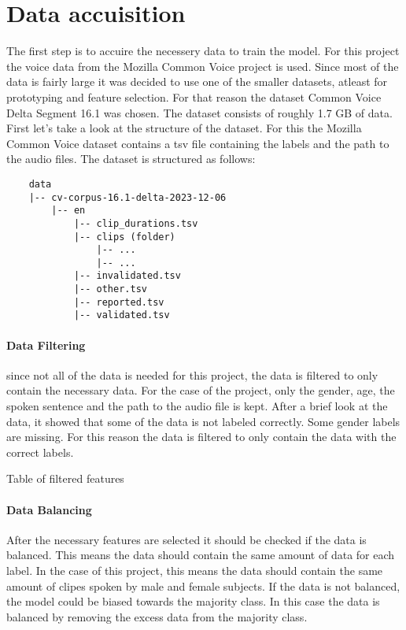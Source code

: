 \section{Data accuisition}

    The first step is to accuire the necessery data to train the model. For this project the voice data from the Mozilla Common Voice project is used. Since most of the data is fairly large it was decided to use one of the smaller datasets, atleast for prototyping and feature selection. For that reason the dataset Common Voice Delta Segment 16.1 was chosen. The dataset consists of roughly 1.7 GB of data. First let's take a look at the structure of the dataset. For this the Mozilla Common Voice dataset contains a tsv file containing the labels and the path to the audio files. 
    \break
    The dataset is structured as follows:
    
    {\iosevka
    \begin{verbatim}
    data
    |-- cv-corpus-16.1-delta-2023-12-06
        |-- en
            |-- clip_durations.tsv
            |-- clips (folder)
                |-- ...
                |-- ...
            |-- invalidated.tsv
            |-- other.tsv
            |-- reported.tsv
            |-- validated.tsv
    \end{verbatim}
    }

    \paragraph{Data Filtering}
    since not all of the data is needed for this project, the data is filtered to only contain the necessary data. For the case of the project, only the gender, age, the spoken sentence and the path to the audio file is kept. After a brief look at the data, it showed that some of the data is not labeled correctly. Some gender labels are missing. For this reason the data is filtered to only contain the data with the correct labels.

    \begin{table}[h!]
        \begin{adjustbox}{max width=\textwidth}
        \end{adjustbox}
        \caption{Table of filtered features}
    \end{table}

    \paragraph{Data Balancing}
    After the necessary features are selected it should be checked if the data is balanced. This means the data should contain the same amount of data for each label. In the case of this project, this means the data should contain the same amount of clipes spoken by male and female subjects. If the data is not balanced, the model could be biased towards the majority class. In this case the data is balanced by removing the excess data from the majority class.

